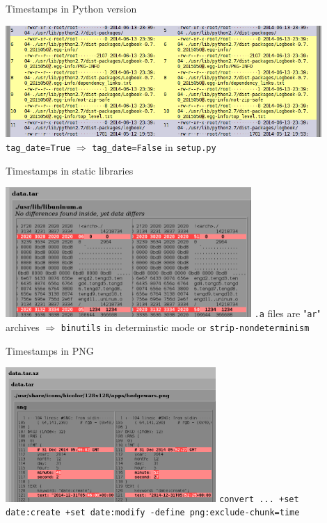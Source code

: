 \documentclass[14pt,aspectratio=169]{beamer}
\begin{document}
\begin{frame}{Timestamps in Python version}
 \begin{center}
  \includegraphics[width=0.9\textwidth]{images/examples/timestamps_in_python_version.png}
  \vfill
  \texttt{tag\_date=True} $\Longrightarrow$ \texttt{tag\_date=False} in \texttt{setup.py}
 \end{center}
\end{frame}

\begin{frame}{Timestamps in static libraries}
 \begin{center}
  \includegraphics[width=0.7\textwidth]{images/examples/timestamps_in_static_library.png}
  \vfill
  \texttt{.a} files are "\texttt{ar}" archives $\Longrightarrow$ \texttt{binutils} in determinstic mode or \texttt{strip-nondeterminism}
 \end{center}
\end{frame}

\begin{frame}{Timestamps in PNG}
 \begin{center}
  \includegraphics[width=0.6\textwidth]{images/examples/timestamps_in_png.png}
  \vfill
  \texttt{convert ... +set date:create +set date:modify -define png:exclude-chunk=time}
 \end{center}
\end{frame}
\end{document}
